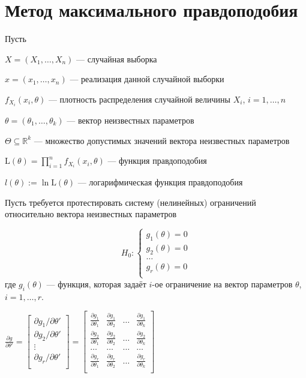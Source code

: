 \documentclass[pdftex,11pt,openany]{book}\usepackage[]{graphicx}\usepackage[]{color}
\begin{document}
\begin{solution}
\end{solution}






\chapter{Метод максимального правдоподобия} %

\begin{problemtext}
Пусть

$X = (X_1,\ldots,X_n)$ --- случайная выборка

$x = (x_1,\ldots,x_n)$ --- реализация данной случайной выборки

$f_{X_i}(x_i, \theta)$ --- плотность распределения случайной величины $X_i$, $i = 1,\ldots, n$

$\theta = (\theta_1, \ldots, \theta_k)$ --- вектор неизвестных параметров

$\Theta \subseteq \mathbb{R}^k$ --- множество допустимых значений вектора неизвестных параметров

$\text{L}(\theta) = \prod_{i=1}^n f_{X_i}(x_i, \theta)$ --- функция правдоподобия

$l(\theta) := \ln \text{L}(\theta)$ --- логарифмическая функция правдоподобия

Пусть требуется протестировать систему (нелинейных) ограничений относительно вектора неизвестных параметров

$$H_0: \begin{cases}
g_1(\theta) = 0 \\
g_2(\theta) = 0 \\
\ldots \\
g_r(\theta) = 0 \\
\end{cases}$$
где $g_i(\theta)$ --- функция, которая задаёт $i$-ое ограничение на вектор параметров $\theta$, $i = 1,\ldots, r$.

$\frac{\partial g}{\partial \theta'} = \begin{bmatrix}
\partial g_1/\partial \theta' \\
\partial g_2/\partial \theta' \\
\vdots \\
\partial g_r/\partial \theta' \\
\end{bmatrix} = \begin{bmatrix}
\frac{\partial g_1}{\partial \theta_1} & \frac{\partial g_1}{\partial \theta_2} & \ldots & \frac{\partial g_1}{\partial \theta_k}\\
\frac{\partial g_2}{\partial \theta_1} & \frac{\partial g_2}{\partial \theta_2} & \ldots & \frac{\partial g_2}{\partial \theta_k}\\
\ldots & \ldots & \ldots & \ldots \\
\frac{\partial g_r}{\partial \theta_1} & \frac{\partial g_r}{\partial \theta_2} & \ldots & \frac{\partial g_r}{\partial \theta_k}\\
\end{bmatrix}$


\end{problemtext}
\end{document}
